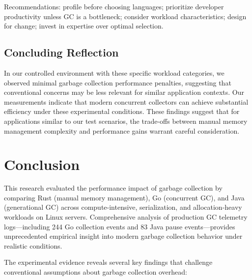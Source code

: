 \documentclass{article}
\begin{document}
Recommendations: profile before choosing languages; prioritize developer productivity unless GC is a bottleneck; consider workload characteristics; design for change; invest in expertise over optimal selection.

\subsection{Concluding Reflection}

In our controlled environment with these specific workload categories, we observed minimal garbage collection performance penalties, suggesting that conventional concerns may be less relevant for similar application contexts. Our measurements indicate that modern concurrent collectors can achieve substantial efficiency under these experimental conditions. These findings suggest that for applications similar to our test scenarios, the trade-offs between manual memory management complexity and performance gains warrant careful consideration.

\section{Conclusion}

This research evaluated the performance impact of garbage collection by comparing Rust (manual memory management), Go (concurrent GC), and Java (generational GC) across compute-intensive, serialization, and allocation-heavy workloads on Linux servers. Comprehensive analysis of production GC telemetry logs—including 244 Go collection events and 83 Java pause events—provides unprecedented empirical insight into modern garbage collection behavior under realistic conditions.

The experimental evidence reveals several key findings that challenge conventional assumptions about garbage collection overhead:
\end{document}
